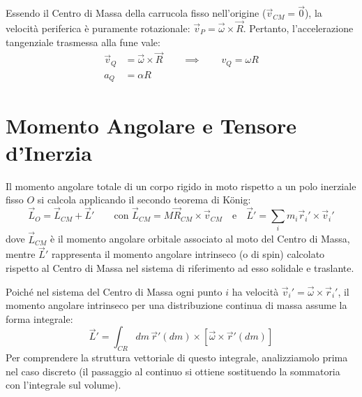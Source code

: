 Essendo il Centro di Massa della carrucola fisso nell'origine ($\vec{v}_{CM} = \vec{0}$), la velocità periferica è puramente rotazionale: $\vec{v}_P = \vec{\omega} \times \vec{R}$. Pertanto, l'accelerazione tangenziale trasmessa alla fune vale:
\begin{align*}
    \vec{v}_Q &= \vec{\omega} \times \vec{R} \qquad \implies \qquad v_Q = \omega R \\
    a_Q &= \alpha R
\end{align*}

\section{Momento Angolare e Tensore d'Inerzia}
Il momento angolare totale di un corpo rigido in moto rispetto a un polo inerziale fisso $O$ si calcola applicando il secondo teorema di König:
\begin{equation}
    \vec{L}_O = \vec{L}_{CM} + \vec{L}' \qquad \text{con } \vec{L}_{CM} = M\vec{R}_{CM} \times \vec{v}_{CM} \quad \text{e} \quad \vec{L}' = \sum_i m_i \vec{r}_i' \times \vec{v}_i'
\end{equation}
dove $\vec{L}_{CM}$ è il momento angolare orbitale associato al moto del Centro di Massa, mentre $\vec{L}'$ rappresenta il momento angolare intrinseco (o di spin) calcolato rispetto al Centro di Massa nel sistema di riferimento ad esso solidale e traslante.

Poiché nel sistema del Centro di Massa ogni punto $i$ ha velocità $\vec{v}_i' = \vec{\omega} \times \vec{r}_i'$, il momento angolare intrinseco per una distribuzione continua di massa assume la forma integrale:
\begin{equation}
    \vec{L}' = \int_{CR} dm \, \vec{r}'(dm) \times \left[ \vec{\omega} \times \vec{r}'(dm) \right]
\end{equation}
Per comprendere la struttura vettoriale di questo integrale, analizziamolo prima nel caso discreto (il passaggio al continuo si ottiene sostituendo la sommatoria con l'integrale sul volume).

